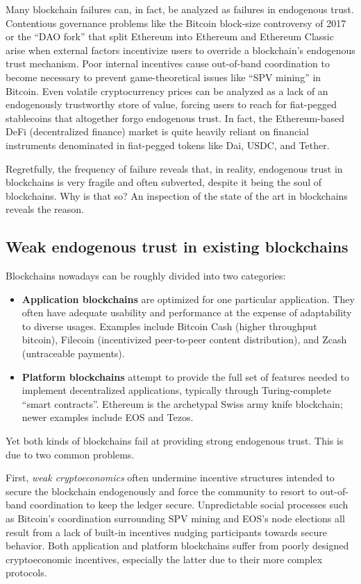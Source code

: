 \documentclass[headinclude,12pt]{scrbook}
\begin{document}
Many blockchain failures can, in fact, be analyzed as failures in endogenous trust. Contentious governance problems like the Bitcoin block-size controversy of 2017 or the ``DAO fork'' that split Ethereum into Ethereum and Ethereum Classic arise when external factors incentivize users to override a blockchain's endogenous trust mechanism. Poor internal incentives cause out-of-band coordination to become necessary to prevent game-theoretical issues like ``SPV mining'' in Bitcoin. Even volatile cryptocurrency prices can be analyzed as a lack of an endogenously trustworthy store of value, forcing users to reach for fiat-pegged stablecoins that altogether forgo endogenous trust. In fact, the Ethereum-based DeFi (decentralized finance) market is quite heavily reliant on financial instruments denominated in fiat-pegged tokens like Dai, USDC, and Tether.

Regretfully, the frequency of failure reveals that, in reality, endogenous trust in blockchains is very fragile and often subverted, despite it being the soul of blockchains. Why is that so? An inspection of the state of the art in blockchains reveals the reason.

\subsection{Weak endogenous trust in existing blockchains}

Blockchains nowadays can be roughly divided into two categories:

\begin{itemize}
    \item \textbf{Application blockchains} are optimized for one particular application. They often have adequate usability and performance at the expense of adaptability to diverse usages. Examples include Bitcoin Cash (higher throughput bitcoin), Filecoin (incentivized peer-to-peer content distribution), and Zcash (untraceable payments).
    \item \textbf{Platform blockchains} attempt to provide the full set of features needed to implement decentralized applications, typically through Turing-complete ``smart contracts''. Ethereum is the archetypal Swiss army knife blockchain; newer examples include EOS and Tezos.
\end{itemize}

Yet both kinds of blockchains fail at providing strong endogenous trust. This is due to two common problems.

First, \emph{weak cryptoeconomics} often undermine incentive structures intended to secure the blockchain endogenously and force the community to resort to out-of-band coordination to keep the ledger secure. Unpredictable social processes such as Bitcoin's coordination surrounding SPV mining and EOS's node elections all result from a lack of built-in incentives nudging participants towards secure behavior. Both application and platform blockchains suffer from poorly designed cryptoeconomic incentives, especially the latter due to their more complex protocols.
\end{document}
